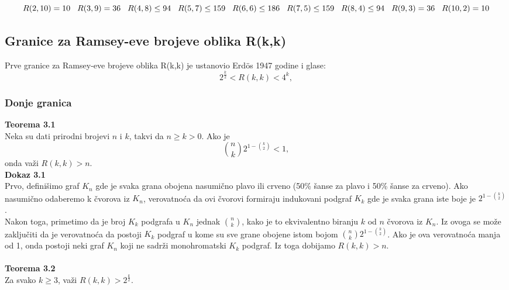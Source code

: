 \documentclass[12pt,a4paper]{article}
\begin{document}
\[R(2,10)=10\hspace{0.3cm}R(3,9)=36\hspace{0.3cm}R(4,8)\leq 94\hspace{0.3cm}R(5,7)\leq 159\hspace{0.3cm}R(6,6)\leq 186\hspace{0.3cm}R(7,5)\leq 159\hspace{0.3cm}R(8,4)\leq 94\hspace{0.3cm}R(9,3)=36\hspace{0.3cm}R(10,2)=10\]
\normalsize
\subsection{Granice za Ramsey-eve brojeve oblika R(k,k)}
Prve granice za Ramsey-eve brojeve oblika R(k,k) je ustanovio  Erd\"os 1947 godine i glase:
\[2^\frac{k}{2}<R(k,k)<4^k,\]

\subsubsection{Donje granica}
{\noindent\fontsize{12pt}{12pt}\textbf{Teorema 3.1}}\\
Neka su dati prirodni brojevi $n$ i $k$, takvi da $n\geq k>0$. Ako je
\[\binom{n}{k}2^{1-\binom{k}{2}}<1,\]
onda važi $R(k,k)>n$.\\

{\noindent\fontsize{12pt}{12pt}\textbf{Dokaz 3.1}} \\
Prvo, definišimo graf $K_n$ gde je svaka grana obojena nasumično plavo ili crveno (50\% šanse za plavo i 50\% šanse za crveno). Ako nasumično odaberemo k čvorova iz $K_n$, verovatnoća da ovi čvorovi formiraju indukovani podgraf $K_k$ gde je svaka grana iste boje je $2^{1-\binom{k}{2}}$.\\
Nakon toga, primetimo da je broj $K_k$ podgrafa u $K_n$ jednak $\binom{n}{k}$, kako je to ekvivalentno biranju $k$ od $n$ čvorova iz $K_n$. Iz ovoga se može zaključiti da je verovatnoća da postoji $K_k$ podgraf u kome su sve grane obojene istom bojom $\binom{n}{k}2^{1-\binom{k}{2}}$. Ako je ova verovatnoća manja od 1, onda postoji neki graf $K_n$ koji ne sadrži monohromatski $K_k$ podgraf. Iz toga dobijamo $R(k,k)>n$. \\ \\

{\noindent\fontsize{12pt}{12pt}\textbf{Teorema 3.2}} \\
Za svako $k\geq 3$, važi $R(k,k)>2^{\frac{k}{2}}$. \\
\end{document}
